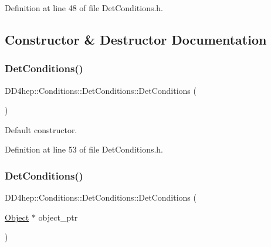 Definition at line 48 of file Det\+Conditions.\+h.



\subsection{Constructor \& Destructor Documentation}
\hypertarget{class_d_d4hep_1_1_conditions_1_1_det_conditions_a9a4cde83aa738c3970fd1cfe2e77f3b0}{}\label{class_d_d4hep_1_1_conditions_1_1_det_conditions_a9a4cde83aa738c3970fd1cfe2e77f3b0} 
\subsubsection{\texorpdfstring{Det\+Conditions()}{DetConditions()}\hspace{0.1cm}{\footnotesize\ttfamily [1/5]}}
{\footnotesize\ttfamily D\+D4hep\+::\+Conditions\+::\+Det\+Conditions\+::\+Det\+Conditions (\begin{DoxyParamCaption}{ }\end{DoxyParamCaption})\hspace{0.3cm}{\ttfamily [inline]}}



Default constructor. 



Definition at line 53 of file Det\+Conditions.\+h.

\hypertarget{class_d_d4hep_1_1_conditions_1_1_det_conditions_a54b5cab9b9fca16db159c7f2cf5a4023}{}\label{class_d_d4hep_1_1_conditions_1_1_det_conditions_a54b5cab9b9fca16db159c7f2cf5a4023} 
\subsubsection{\texorpdfstring{Det\+Conditions()}{DetConditions()}\hspace{0.1cm}{\footnotesize\ttfamily [2/5]}}
{\footnotesize\ttfamily D\+D4hep\+::\+Conditions\+::\+Det\+Conditions\+::\+Det\+Conditions (\begin{DoxyParamCaption}\item[{\hyperlink{class_d_d4hep_1_1_conditions_1_1_det_conditions_a4c0ad456b1967b5b724894f23ef63dec}{Object} $\ast$}]{object\+\_\+ptr }\end{DoxyParamCaption})\hspace{0.3cm}{\ttfamily [inline]}}



